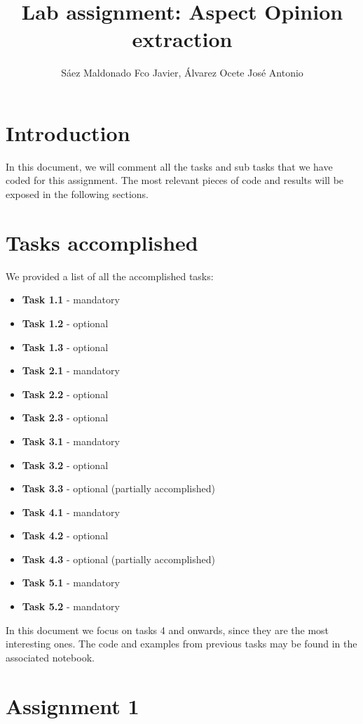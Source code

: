 \documentclass[11pt]{article}
\title{Lab assignment: Aspect Opinion extraction}
\author{Sáez Maldonado Fco Javier, Álvarez Ocete José Antonio}
\begin{document}
\maketitle

\section*{Introduction}

In this document, we will comment all the tasks and sub tasks that we have coded for this assignment. The most relevant pieces of code and results will be exposed in the following sections.\\

\section{Tasks accomplished}

We provided a list of all the accomplished tasks:

\begin{itemize}
    \item \textbf{Task 1.1} - mandatory
    \item \textbf{Task 1.2} - optional
    \item \textbf{Task 1.3} - optional
    \item \textbf{Task 2.1} - mandatory
    \item \textbf{Task 2.2} - optional
    \item \textbf{Task 2.3} - optional
    \item \textbf{Task 3.1} - mandatory
    \item \textbf{Task 3.2} - optional
    \item \textbf{Task 3.3} - optional (partially accomplished)
    \item \textbf{Task 4.1} - mandatory
    \item \textbf{Task 4.2} - optional
    \item \textbf{Task 4.3} - optional (partially accomplished)
    \item \textbf{Task 5.1} - mandatory
    \item \textbf{Task 5.2} - mandatory
\end{itemize}

In this document we focus on tasks 4 and onwards, since they are the most interesting ones. The code and examples from previous tasks may be found in the associated notebook. 

\hypertarget{assignment-1}{%
    \section{Assignment 1}\label{assignment-1}}
\end{document}
